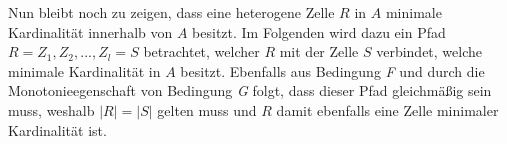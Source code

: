 Nun bleibt noch zu zeigen, dass eine heterogene Zelle $R$ in $A$ minimale Kardinalität innerhalb von $A$ besitzt.
Im Folgenden wird dazu ein Pfad $R=Z_1,Z_2,...,Z_l=S$ betrachtet, welcher $R$ mit der Zelle $S$ verbindet, welche minimale Kardinalität in $A$ besitzt.
Ebenfalls aus Bedingung \emph{F} und durch die Monotonieegenschaft von Bedingung \emph{G} folgt, dass dieser Pfad gleichmäßig sein muss, weshalb $|R|=|S|$ gelten muss und $R$ damit ebenfalls eine Zelle minimaler Kardinalität ist.